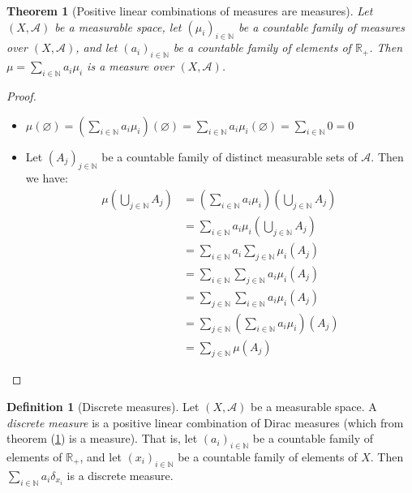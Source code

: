 \documentclass{article}
\newtheorem{theorem}{Theorem}[section]
\theoremstyle{definition}
\newtheorem{definition}{Definition}[section]
\theoremstyle{remark}
\theoremstyle{example}
\theoremstyle{notation}
\theoremstyle{axiom}
\begin{document}
\begin{theorem}[Positive linear combinations of measures are measures] \label{thm:pos_lin_comb_measures}
    Let $(X, \mathcal{A})$ be a measurable space, let $(\mu_i)_{i \in \mathbb{N}}$ be a countable family of measures over $(X, \mathcal{A})$, and let $(a_i)_{i \in \mathbb{N}}$ be a countable family of elements of $\mathbb{R}_+$. Then $\mu = \sum_{i \in \mathbb{N}} a_i \mu_i$ is a measure over $(X, \mathcal{A})$.
\end{theorem}

\begin{proof}~
    \begin{itemize}
        \item $\mu(\varnothing) = \left(\sum_{i \in \mathbb{N}} a_i \mu_i\right)(\varnothing) = \sum_{i \in \mathbb{N}} a_i \mu_i(\varnothing) = \sum_{i \in \mathbb{N}} 0 = 0$
        \item Let $(A_j)_{j \in \mathbb{N}}$ be a countable family of distinct measurable sets of $\mathcal{A}$. Then we have:
        \begin{align*}
            \mu(\bigcup_{j \in \mathbb{N}} A_j) &= \left(\sum_{i \in \mathbb{N}} a_i \mu_i\right)(\bigcup_{j \in \mathbb{N}} A_j)\\
            &= \sum_{i \in \mathbb{N}} a_i \mu_i(\bigcup_{j \in \mathbb{N}} A_j)\\
            &= \sum_{i \in \mathbb{N}} a_i \sum_{j \in \mathbb{N}} \mu_i(A_j)\\
            &= \sum_{i \in \mathbb{N}} \sum_{j \in \mathbb{N}} a_i \mu_i(A_j)\\
            &= \sum_{j \in \mathbb{N}} \sum_{i \in \mathbb{N}} a_i \mu_i(A_j)\\
            &= \sum_{j \in \mathbb{N}} \left(\sum_{i \in \mathbb{N}} a_i \mu_i\right)(A_j)\\
            &= \sum_{j \in \mathbb{N}} \mu(A_j)
        \end{align*}
    \end{itemize}
\end{proof}

\begin{definition}[Discrete measures]
    Let $(X, \mathcal{A})$ be a measurable space. A \textit{discrete measure} is a positive linear combination of Dirac measures (which from theorem (\ref{thm:pos_lin_comb_measures}) is a measure). That is, let $(a_i)_{i \in \mathbb{N}}$ be a countable family of elements of $\mathbb{R}_+$, and let $(x_i)_{i \in \mathbb{N}}$ be a countable family of elements of $X$. Then $\sum_{i \in \mathbb{N}} a_i \delta_{x_i}$ is a discrete measure.
\end{definition}
\end{document}
